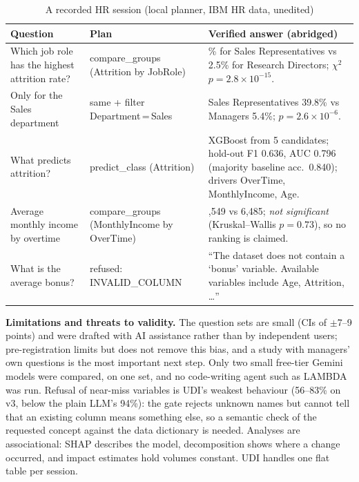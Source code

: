 \documentclass[conference]{IEEEtran}
\begin{document}
\begin{table}[t]
\caption{A recorded HR session (local planner, IBM HR data, unedited)}
\label{tab:case}
\centering\scriptsize
\setlength{\tabcolsep}{2.5pt}
\renewcommand{\arraystretch}{1.08}
\begin{tabular}{>{\raggedright\arraybackslash}p{1.95cm}>{\raggedright\arraybackslash}p{1.85cm}>{\raggedright\arraybackslash}p{4.0cm}}
\toprule
Question & Plan & Verified answer (abridged)\\
\midrule
Which job role has the highest attrition rate? & compare\_groups (Attrition by JobRole) & 39.8\% for Sales Representatives vs 2.5\% for Research Directors; $\chi^2$ $p=2.8{\times}10^{-15}$.\\
Only for the Sales department & same + filter Department\,=\,Sales & Sales Representatives 39.8\% vs Managers 5.4\%; $p=2.6{\times}10^{-6}$.\\
What predicts attrition? & predict\_class (Attrition) & XGBoost from 5 candidates; hold-out F1 0.636, AUC 0.796 (majority baseline acc.\ 0.840); drivers OverTime, MonthlyIncome, Age.\\
Average monthly income by overtime & compare\_groups (Monthly\-Income by OverTime) & 6,549 vs 6,485; \emph{not significant} (Kruskal--Wallis $p=0.73$), so no ranking is claimed.\\
What is the average bonus? & refused: INVALID\_COLUMN & ``The dataset does not contain a `bonus' variable. Available variables include Age, Attrition, \dots''\\
\bottomrule
\end{tabular}
\end{table}

\textbf{Limitations and threats to validity.} The question sets are small (CIs of $\pm$7--9 points) and were drafted with AI assistance rather than by independent users; pre-registration limits but does not remove this bias, and a study with managers' own questions is the most important next step. Only two small free-tier Gemini models were compared, on one set, and no code-writing agent such as LAMBDA was run. Refusal of near-miss variables is UDI's weakest behaviour (56--83\% on v3, below the plain LLM's 94\%): the gate rejects unknown names but cannot tell that an existing column means something else, so a semantic check of the requested concept against the data dictionary is needed. Analyses are associational: SHAP describes the model, decomposition shows where a change occurred, and impact estimates hold volumes constant. UDI handles one flat table per session.
\end{document}
